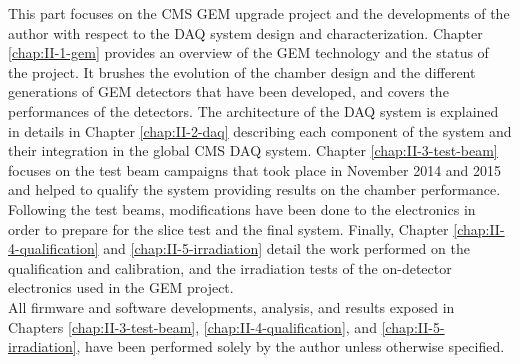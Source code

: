 This part focuses on the CMS GEM upgrade project and the developments of the author with respect to the DAQ system design and characterization. Chapter \ref{chap:II-1-gem} provides an overview of the GEM technology and the status of the project. It brushes the evolution of the chamber design and the different generations of GEM detectors that have been developed, and covers the performances of the detectors. The architecture of the DAQ system is explained in details in Chapter \ref{chap:II-2-daq} describing each component of the system and their integration in the global CMS DAQ system. Chapter \ref{chap:II-3-test-beam} focuses on the test beam campaigns that took place in November 2014 and 2015 and helped to qualify the system providing results on the chamber performance. Following the test beams, modifications have been done to the electronics in order to prepare for the slice test and the final system. Finally, Chapter \ref{chap:II-4-qualification} and \ref{chap:II-5-irradiation} detail the work performed on the qualification and calibration, and the irradiation tests of the on-detector electronics used in the GEM project. \\

All firmware and software developments, analysis, and results exposed in Chapters \ref{chap:II-3-test-beam}, \ref{chap:II-4-qualification}, and \ref{chap:II-5-irradiation}, have been performed solely by the author unless otherwise specified.
